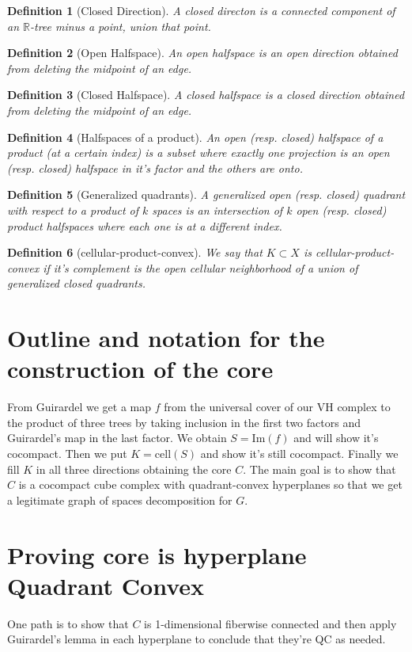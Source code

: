 \documentclass{article}
\theoremstyle{mystyle}
\newtheorem{defn}{Definition}
\theoremstyle{remark}
\begin{document}
\begin{defn}[Closed Direction] A closed directon is a connected component of an \(\mathbb{R}\)-tree minus a point, union that point.
\end{defn}
\begin{defn}[Open Halfspace] An open halfspace is an open direction obtained from deleting the midpoint of an edge.
\end{defn}
\begin{defn}[Closed Halfspace] A closed halfspace is a closed direction obtained from deleting the midpoint of an edge.
\end{defn}
\begin{defn}[Halfspaces of a product] An open (resp. closed) halfspace of a product (at a certain index) is a subset where exactly one projection is an open (resp. closed)  halfspace in it's factor and the others are onto.
\end{defn}
\begin{defn}[Generalized quadrants] A generalized open (resp. closed) quadrant with respect to a product of \(k\) spaces is an intersection of \(k\) open (resp. closed) product halfspaces where each one is at a different index.
\end{defn}
\begin{defn}[cellular-product-convex] We say that \(K \subset X\) is cellular-product-convex if it's complement is the open cellular neighborhood of a union of generalized closed quadrants.
\end{defn}



\section{Outline and notation for the construction of the core}

    From Guirardel we get a map \(f\) from the universal cover of our VH complex to the product of three trees by taking inclusion in the first two factors and Guirardel's map in the last factor. We obtain \(S = \text{Im}(f)\) and will show it's cocompact. Then we put \(K = \text{cell}{(S)}\) and show it's still cocompact. Finally we fill \(K\) in all three directions obtaining the core \(C\). The main goal is to show that \(C\) is a cocompact cube complex with quadrant-convex hyperplanes so that we get a legitimate graph of spaces decomposition for \(G\).

\section{Proving core is hyperplane Quadrant Convex}
One path is to show that \(C\) is 1-dimensional fiberwise connected and then apply Guirardel's lemma in each hyperplane to conclude that they're QC as needed.
\end{document}
